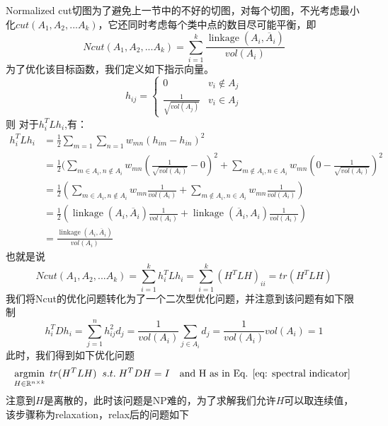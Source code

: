 Normalized cut切图为了避免上一节中的不好的切图，对每个切图，不光考虑最小化$cut(A_1,A_2,...A_k)$，它还同时考虑每个类中点的数目尽可能平衡，即
\begin{equation}
Ncut(A_1,A_2,...A_k) = \sum\limits_{i=1}^{k}\frac{\operatorname{linkage}(A_i, \overline{A}_i )}{vol(A_i)}
\end{equation}
为了优化该目标函数，我们定义如下指示向量。
\begin{equation}
\label{eq: spectral indicator}
h_{ij}= \begin{cases} 0& { v_i \notin A_j}\\ \frac{1}{\sqrt{vol(A_j)}}& { v_i \in A_j} \end{cases}
\end{equation}
则
对于$h_i^TLh_i$,有：
\begin{align} h_i^TLh_i & = \frac{1}{2}\sum\limits_{m=1}\sum\limits_{n=1}w_{mn}(h_{im}-h_{in})^2 \\& =\frac{1}{2}(\sum\limits_{m \in A_i, n \notin A_i}w_{mn}(\frac{1}{\sqrt{vol(A_i)}} - 0)^2 +  \sum\limits_{m \notin A_i, n \in A_i}w_{mn}(0 - \frac{1}{\sqrt{vol(A_i)}} )^2\\& = \frac{1}{2}(\sum\limits_{m \in A_i, n \notin A_i}w_{mn}\frac{1}{vol(A_i)} +  \sum\limits_{m \notin A_i, n \in A_i}w_{mn}\frac{1}{vol(A_i)})\\& = \frac{1}{2}(\operatorname{linkage}(A_i, \overline{A}_i) \frac{1}{vol(A_i)} + \operatorname{linkage}(\overline{A}_i, A_i) \frac{1}{vol(A_i)}) \\& =  \frac{\operatorname{linkage}(A_i, \overline{A}_i)}{vol(A_i)} 
\end{align}
也就是说
\begin{equation}
Ncut(A_1,A_2,...A_k) = \sum\limits_{i=1}^{k}h_i^TLh_i = \sum\limits_{i=1}^{k}(H^TLH)_{ii} = tr(H^TLH)
\end{equation}
我们将Ncut的优化问题转化为了一个二次型优化问题，并注意到该问题有如下限制
\begin{equation}
h_i^TDh_i = \sum\limits_{j=1}^{n}h_{ij}^2d_j =\frac{1}{vol(A_i)}\sum\limits_{j \in A_i}d_j= \frac{1}{vol(A_i)}vol(A_i) =1
\end{equation}
此时，我们得到如下优化问题
\begin{equation}
\label{eq: ori_spectral_clustering}
\operatorname*{argmin}\limits_{H \in \mathbb{R}^{n \times k}} \; tr(H^TLH) \;\; s.t.\;H^TDH=I \quad \text{and H as in Eq. \ref{eq: spectral indicator} }
\end{equation}
注意到$H$是离散的，此时该问题是NP难的，为了求解我们允许$H$可以取连续值，该步骤称为relaxation，relax后的问题如下
